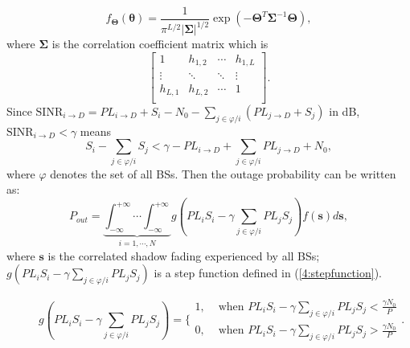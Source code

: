 \documentclass[journal,10pt]{IEEEtran}
\begin{document}
 \begin{equation}
 f_{\mathbf{\Theta}}(\boldsymbol{\theta}) = \frac{1}{\pi^{L/2}|\mathbf{\Sigma}|^{1/2}}\exp(-\mathbf{\Theta}^{T}\mathbf{\Sigma}^{-1}\mathbf{\Theta}),
 \end{equation}
 where $\mathbf{\Sigma}$ is the correlation coefficient matrix which is
 \begin{equation}
 \left[\begin{array}{cccc}
 1 & h_{1,2} & \cdots & h_{1,L}\\
 \vdots & \ddots & \ddots & \vdots\\
 h_{L,1} & h_{L,2} & \cdots & 1\\
 \end{array}\right].
 \end{equation}
 Since $\text{SINR}_{i\to D}=PL_{i\to D}+S_{i}-N_{0}-\sum_{j\in\varphi/i}(PL_{j\to D} + S_{j})$ in dB, $\text{SINR}_{i\to D}<\gamma$ means
 \begin{equation}
 S_{i} - \sum_{j\in\varphi/i}S_{j}<\gamma -PL_{i\to D} + \sum_{j\in\varphi/i}PL_{j\to D} + N_{0},
 \end{equation}
 where $\varphi$ denotes the set of all BSs.
 Then the outage probability can be written as:
 \begin{equation}
 \label{4:outprob}
 P_{out} = \underbrace{\int_{-\infty}^{+\infty}\cdots\int_{-\infty}^{+\infty}}_{i =1,\cdots,N} g(PL_{i}S_{i} - \gamma\sum_{j\in\varphi/i}PL_{j}S_{j})f(\mathbf{s})d\mathbf{s},
 \end{equation}
 where $\mathbf{s}$ is the correlated shadow fading experienced by all BSs; $g(PL_{i}S_{i} - \gamma\sum_{j\in\varphi/i}PL_{j}S_{j})$ is a step function defined in (\ref{4:stepfunction}). 
  \begin{figure}[!t]
 \normalsize

 \begin{equation}
 \label{4:stepfunction}
 g(PL_{i}S_{i} - \gamma\sum_{j\in\varphi/i}PL_{j}S_{j}) = \{\begin{array}{cc}
                1, &  \text{  when }PL_{i}S_{i} - \gamma\sum_{j\in\varphi/i}PL_{j}S_{j} <\frac{\gamma N_{0}}{P}\\
                0, & \text{  when }PL_{i}S_{i} - \gamma\sum_{j\in\varphi/i}PL_{j}S_{j} >\frac{\gamma N_{0}}{P}
              \end{array}.
 \end{equation}
 \hrulefill
 \vspace*{4pt}
 \end{figure}
\end{document}
